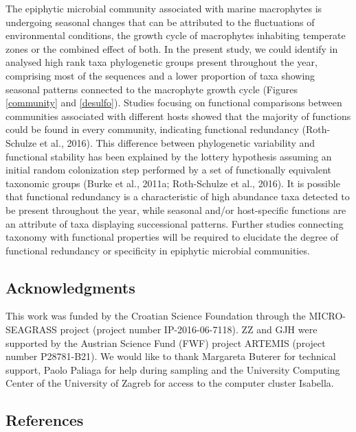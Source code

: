 \documentclass[
  12pt,
]{article}
\begin{document}
The epiphytic microbial community associated with marine macrophytes is
undergoing seasonal changes that can be attributed to the fluctuations
of environmental conditions, the growth cycle of macrophytes inhabiting
temperate zones or the combined effect of both. In the present study, we
could identify in analysed high rank taxa phylogenetic groups present
throughout the year, comprising most of the sequences and a lower
proportion of taxa showing seasonal patterns connected to the macrophyte
growth cycle (Figures \ref{community} and \ref{desulfo}). Studies
focusing on functional comparisons between communities associated with
different hosts showed that the majority of functions could be found in
every community, indicating functional redundancy (Roth-Schulze et al.,
2016). This difference between phylogenetic variability and functional
stability has been explained by the lottery hypothesis assuming an
initial random colonization step performed by a set of functionally
equivalent taxonomic groups (Burke et al., 2011a; Roth-Schulze et al.,
2016). It is possible that functional redundancy is a characteristic of
high abundance taxa detected to be present throughout the year, while
seasonal and/or host-specific functions are an attribute of taxa
displaying successional patterns. Further studies connecting taxonomy
with functional properties will be required to elucidate the degree of
functional redundancy or specificity in epiphytic microbial communities.

\hypertarget{acknowledgments}{%
\subsection{Acknowledgments}\label{acknowledgments}}

This work was funded by the Croatian Science Foundation through the
MICRO-SEAGRASS project (project number IP-2016-06-7118). ZZ and GJH were
supported by the Austrian Science Fund (FWF) project ARTEMIS (project
number P28781-B21). We would like to thank Margareta Buterer for
technical support, Paolo Paliaga for help during sampling and the
University Computing Center of the University of Zagreb for access to
the computer cluster Isabella.

\newpage

\hypertarget{references}{%
\subsection{References}\label{references}}
\end{document}
